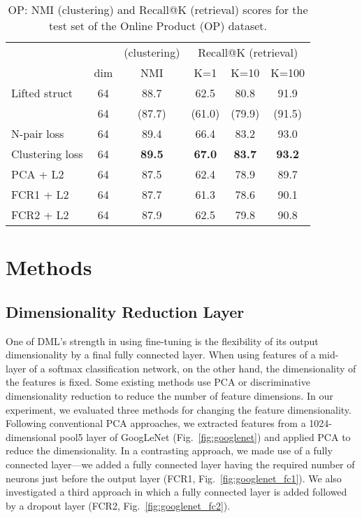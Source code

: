 \documentclass[9pt,technote,compsoc]{./sty/IEEEtran}
\newcommand{\Fref}[1]{Fig.~\ref{#1}}
\begin{document}
\begin{table*}
	\centering
	\caption{OP: NMI (clustering) and Recall@K (retrieval) scores for the test set of the Online Product (OP) dataset.}
	\label{tbl:OP}
	\begin{tabular}{lccccc}\toprule
		&&(clustering)&\multicolumn{3}{c}{Recall@K (retrieval)}\\\cmidrule(lr){4-6}
		&dim&NMI&K=1&K=10&K=100\\\midrule
		Lifted struct \cite{song2016deep}&64&88.7&62.5&80.8&91.9\\
		                                             &64&(87.7)&(61.0)&(79.9)&(91.5)\\
		N-pair loss \cite{sohn2016improved}&64&89.4&66.4&83.2&93.0\\
		Clustering loss \cite{song2017learnable}&64&\textbf{89.5}&\textbf{67.0}&\textbf{83.7}&\textbf{93.2}\\
		PCA + L2&64&87.5&62.4&78.9&89.7\\
		FCR1 + L2&64&87.7&61.3&78.6&90.1\\
		FCR2 + L2&64&87.9&62.5&79.8&90.8\\\bottomrule
	\end{tabular}
\end{table*}

\section{Methods}

\subsection{Dimensionality Reduction Layer}
\label{sec:dimensionaliry_reduction_layer}

One of DML's strength in using fine-tuning is the flexibility of its output dimensionality by a final fully connected layer.
When using features of a mid-layer of a softmax classification network, on the other hand, the dimensionality of the features is fixed.
Some existing methods \cite{babenko2014neural} use PCA or discriminative dimensionality reduction to reduce the number of feature dimensions.
In our experiment, we evaluated three methods for changing the feature dimensionality.
Following conventional PCA approaches, we extracted features from a 1024-dimensional pool5 layer of GoogLeNet \cite{szegedy2015going} (\Fref{fig:googlenet}) and applied PCA to reduce the dimensionality.
In a contrasting approach, we made use of a fully connected layer---we added a fully connected layer having the required 
number of neurons just before the output layer (FCR1, \Fref{fig:googlenet_fc1}).
We also investigated a third approach in which a fully connected layer is added followed by a dropout layer (FCR2, \Fref{fig:googlenet_fc2}).
\end{document}
